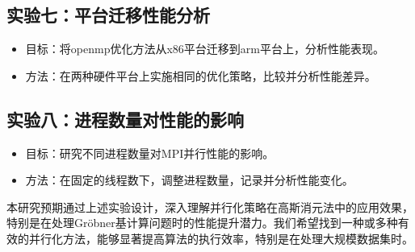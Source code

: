 \documentclass[UTF8,a4paper,10pt]{ctexart}
\begin{document}
\subsection{实验七：平台迁移性能分析}
\begin{itemize}
  \item 目标：将openmp优化方法从x86平台迁移到arm平台上，分析性能表现。
  \item 方法：在两种硬件平台上实施相同的优化策略，比较并分析性能差异。
\end{itemize}
\subsection{实验八：进程数量对性能的影响}
\begin{itemize}
  \item 目标：研究不同进程数量对MPI并行性能的影响。
  \item 方法：在固定的线程数下，调整进程数量，记录并分析性能变化。
\end{itemize}

本研究预期通过上述实验设计，深入理解并行化策略在高斯消元法中的应用效果，特别是在处理Gröbner基计算问题时的性能提升潜力。我们希望找到一种或多种有效的并行化方法，能够显著提高算法的执行效率，特别是在处理大规模数据集时。
\newpage

 
\end{document}
